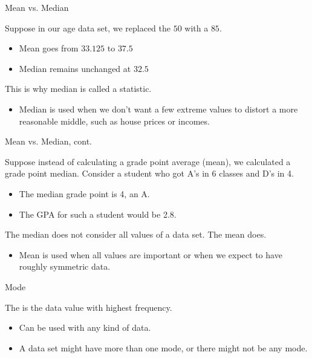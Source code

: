 \documentclass[xcolor=table, handout]{beamer}
\begin{document}
\begin{frame}{Mean vs. Median}
\begin{exampleblock}{}
Suppose in our age data set, we replaced the $50$ with a $85$.
\begin{itemize}
\item Mean goes from $33.125$ to $37.5$
\item Median remains unchanged at $32.5$
\end{itemize}
\end{exampleblock}

\pause
\begin{block}{}
This is why median is called a  statistic.
\begin{itemize}
\item Median is used when we don't want a few extreme values to distort a more reasonable middle, such as house prices or incomes.
\end{itemize}
\end{block}
\end{frame}

\begin{frame}{Mean vs. Median, cont.}
\begin{exampleblock}{}
Suppose instead of calculating a grade point average (mean), we calculated a grade point median. Consider a student who got A's in 6 classes and D's in 4.
\begin{itemize}
\item The median grade point is 4, an A.
\item The GPA for such a student would be 2.8.
\end{itemize}
\end{exampleblock}

\pause
\begin{block}{}
The median does not consider all values of a data set. The mean does.
\begin{itemize}
\item Mean is used when all values are important or when we expect to have roughly symmetric data.
\end{itemize}
\end{block}
\end{frame}

\begin{frame}{Mode}
\begin{block}{}
The  is the data value with highest frequency.
\begin{itemize}
\item Can be used with any kind of data.
\item A data set might have more than one mode, or there might not be any mode.
\end{itemize}
\end{block}
\end{frame}
\end{document}
